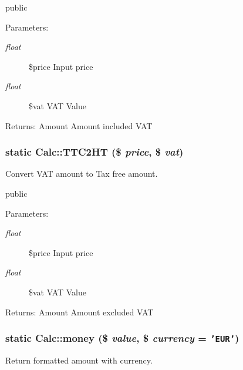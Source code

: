 public \begin{Desc}
\item[Parameters:]
\begin{description}
\item[{\em float}]\$price Input price \item[{\em float}]\$vat VAT Value \end{description}
\end{Desc}
\begin{Desc}
\item[Returns:]Amount Amount included VAT \end{Desc}
\hypertarget{classCalc_5fd87cac52c2cc34fb22fcb732f5ee21}{
\subsubsection[TTC2HT]{\setlength{\rightskip}{0pt plus 5cm}static Calc::TTC2HT (\$ {\em price}, \/  \$ {\em vat})}}
\label{classCalc_5fd87cac52c2cc34fb22fcb732f5ee21}


Convert VAT amount to Tax free amount.

public \begin{Desc}
\item[Parameters:]
\begin{description}
\item[{\em float}]\$price Input price \item[{\em float}]\$vat VAT Value \end{description}
\end{Desc}
\begin{Desc}
\item[Returns:]Amount Amount excluded VAT \end{Desc}
\hypertarget{classCalc_6e330532dcf40889cc96f09dcdcba7b4}{
\subsubsection[money]{\setlength{\rightskip}{0pt plus 5cm}static Calc::money (\$ {\em value}, \/  \$ {\em currency} = {\tt 'EUR'})}}
\label{classCalc_6e330532dcf40889cc96f09dcdcba7b4}


Return formatted amount with currency.

